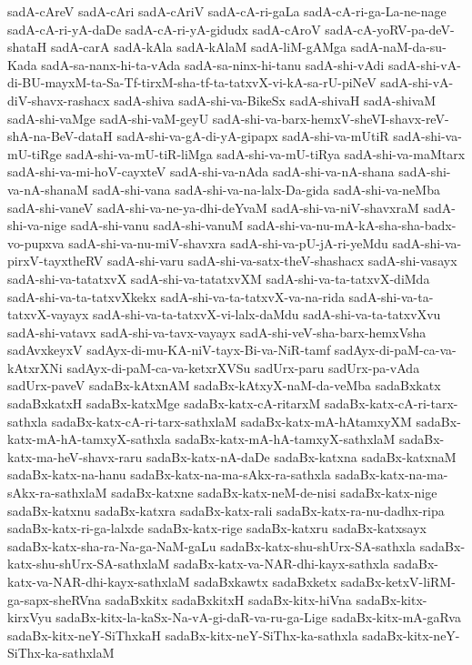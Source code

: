 {sadA-cAreV
sadA-cAri
sadA-cAriV
sadA-cA-ri-gaLa
sadA-cA-ri-ga-La-ne-nage
sadA-cA-ri-yA-daDe
sadA-cA-ri-yA-gidudx
sadA-cAroV
sadA-cA-yoRV-pa-deV-shataH
sadA-carA
sadA-kAla
sadA-kAlaM
sadA-liM-gAMga
sadA-naM-da-su-Kada
sadA-sa-nanx-hi-ta-vAda
sadA-sa-ninx-hi-tanu
sadA-shi-vAdi
sadA-shi-vA-di-BU-mayxM-ta-Sa-Tf-tirxM-sha-tf-ta-tatxvX-vi-kA-sa-rU-piNeV
sadA-shi-vA-diV-shavx-rashacx
sadA-shiva
sadA-shi-va-BikeSx
sadA-shivaH
sadA-shivaM
sadA-shi-vaMge
sadA-shi-vaM-geyU
sadA-shi-va-barx-hemxV-sheVI-shavx-reV-shA-na-BeV-dataH
sadA-shi-va-gA-di-yA-gipapx
sadA-shi-va-mUtiR
sadA-shi-va-mU-tiRge
sadA-shi-va-mU-tiR-liMga
sadA-shi-va-mU-tiRya
sadA-shi-va-maMtarx
sadA-shi-va-mi-hoV-cayxteV
sadA-shi-va-nAda
sadA-shi-va-nA-shana
sadA-shi-va-nA-shanaM
sadA-shi-vana
sadA-shi-va-na-lalx-Da-gida
sadA-shi-va-neMba
sadA-shi-vaneV
sadA-shi-va-ne-ya-dhi-deYvaM
sadA-shi-va-niV-shavxraM
sadA-shi-va-nige
sadA-shi-vanu
sadA-shi-vanuM
sadA-shi-va-nu-mA-kA-sha-sha-badx-vo-pupxva
sadA-shi-va-nu-miV-shavxra
sadA-shi-va-pU-jA-ri-yeMdu
sadA-shi-va-pirxV-tayxtheRV
sadA-shi-varu
sadA-shi-va-satx-theV-shashacx
sadA-shi-vasayx
sadA-shi-va-tatatxvX
sadA-shi-va-tatatxvXM
sadA-shi-va-ta-tatxvX-diMda
sadA-shi-va-ta-tatxvXkekx
sadA-shi-va-ta-tatxvX-va-na-rida
sadA-shi-va-ta-tatxvX-vayayx
sadA-shi-va-ta-tatxvX-vi-lalx-daMdu
sadA-shi-va-ta-tatxvXvu
sadA-shi-vatavx
sadA-shi-va-tavx-vayayx
sadA-shi-veV-sha-barx-hemxVsha
sadAvxkeyxV
sadAyx-di-mu-KA-niV-tayx-Bi-va-NiR-tamf
sadAyx-di-paM-ca-va-kAtxrXNi
sadAyx-di-paM-ca-va-ketxrXVSu
sadUrx-paru
sadUrx-pa-vAda
sadUrx-paveV
sadaBx-kAtxnAM
sadaBx-kAtxyX-naM-da-veMba
sadaBxkatx
sadaBxkatxH
sadaBx-katxMge
sadaBx-katx-cA-ritarxM
sadaBx-katx-cA-ri-tarx-sathxla
sadaBx-katx-cA-ri-tarx-sathxlaM
sadaBx-katx-mA-hAtamxyXM
sadaBx-katx-mA-hA-tamxyX-sathxla
sadaBx-katx-mA-hA-tamxyX-sathxlaM
sadaBx-katx-ma-heV-shavx-raru
sadaBx-katx-nA-daDe
sadaBx-katxna
sadaBx-katxnaM
sadaBx-katx-na-hanu
sadaBx-katx-na-ma-sAkx-ra-sathxla
sadaBx-katx-na-ma-sAkx-ra-sathxlaM
sadaBx-katxne
sadaBx-katx-neM-de-nisi
sadaBx-katx-nige
sadaBx-katxnu
sadaBx-katxra
sadaBx-katx-rali
sadaBx-katx-ra-nu-dadhx-ripa
sadaBx-katx-ri-ga-lalxde
sadaBx-katx-rige
sadaBx-katxru
sadaBx-katxsayx
sadaBx-katx-sha-ra-Na-ga-NaM-gaLu
sadaBx-katx-shu-shUrx-SA-sathxla
sadaBx-katx-shu-shUrx-SA-sathxlaM
sadaBx-katx-va-NAR-dhi-kayx-sathxla
sadaBx-katx-va-NAR-dhi-kayx-sathxlaM
sadaBxkawtx
sadaBxketx
sadaBx-ketxV-liRM-ga-sapx-sheRVna
sadaBxkitx
sadaBxkitxH
sadaBx-kitx-hiVna
sadaBx-kitx-kirxVyu
sadaBx-kitx-la-kaSx-Na-vA-gi-daR-va-ru-ga-Lige
sadaBx-kitx-mA-gaRva
sadaBx-kitx-neY-SiThxkaH
sadaBx-kitx-neY-SiThx-ka-sathxla
sadaBx-kitx-neY-SiThx-ka-sathxlaM
}
